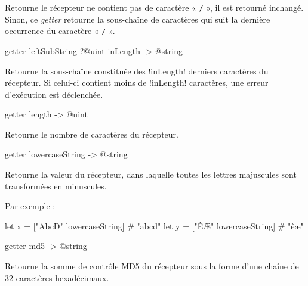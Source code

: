 Retourne le récepteur ne contient pas de caractère « \texttt{/} », il est retourné inchangé. Sinon, ce \emph{getter} retourne la sous-chaîne de caractères qui suit la dernière occurrence du caractère « \texttt{/} ».









\begin{galgasbox}
getter leftSubString ?@uint inLength -> @string
\end{galgasbox}

Retourne la sous-chaîne constituée des \ggs!inLength! derniers caractères du récepteur. Si celui-ci contient moins de \ggs!inLength! caractères, une erreur d'exécution est déclenchée.









\begin{galgasbox}
getter length -> @uint
\end{galgasbox}

Retourne le nombre de caractères du récepteur.









\begin{galgasbox}
getter lowercaseString -> @string
\end{galgasbox}

Retourne la valeur du récepteur, dans laquelle toutes les lettres majuscules sont transformées en minuscules.

Par exemple :
\begin{galgas}
let x = ["AbcD" lowercaseString] # "abcd"
let y = ["ÊÆ" lowercaseString] # "êæ"
\end{galgas}








\begin{galgasbox}
getter md5 -> @string
\end{galgasbox}

Retourne la somme de contrôle MD5 du récepteur sous la forme d'une chaîne de 32 caractères hexadécimaux.

